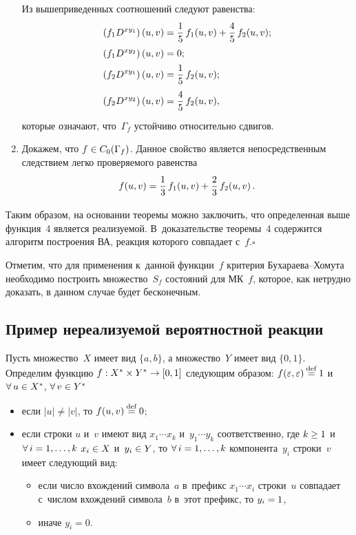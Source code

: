 \begin{multicols}{2}
\begin{enumerate}[1.]
Из вышеприведенных соотношений следуют равенства:
\begin{align*}
\left(f_1D^{xy_1}\right)(u,v)&=\displaystyle\frac{\displaystyle 1\mathstrut}{\displaystyle 5\mathstrut}\,f_1(u,v)+\displaystyle\frac{\displaystyle 4\mathstrut}{\displaystyle 5\mathstrut}\,f_2(u,v);\\
\left(f_1D^{xy_2}\right)(u,v)&=0;\\
\left(f_2D^{xy_1}\right)(u,v)&=\displaystyle\frac{\displaystyle 1\mathstrut}{\displaystyle 5\mathstrut}\,f_2(u,v);\\
\left(f_2D^{xy_2}\right)(u,v)&=\displaystyle\frac{\displaystyle 4\mathstrut}{\displaystyle 5\mathstrut}\,f_2(u,v),
\end{align*}
которые означают, что~$\Gamma_f$ устойчиво относительно сдвигов.

\item Докажем, что $f\hm\in C_0(\Gamma_f)$. Данное свойство
является непосредственным следствием легко проверяемого равенства
$$
f(u,v)=\displaystyle\frac{\displaystyle 1\mathstrut}{\displaystyle 3\mathstrut}\,f_1(u,v)+\displaystyle\frac{\displaystyle 2\mathstrut}{\displaystyle 3\mathstrut}\,f_2(u,v)\,.
$$
\end{enumerate}
Таким образом, на основании теоремы можно заключить, что
определенная выше функция~4 являет\-ся реализуемой.
В~доказательстве теоремы~4 содержится алгоритм построения
ВА, реакция которого совпадает с~$f$.\hfill$\square$

\medskip


Отметим, что для применения к~данной функции~$f$
критерия Бу\-ха\-ра\-ева--Хо\-му\-та необходимо построить
множество~$S_f$ состояний для МК~$f$, которое, как нетрудно доказать,
в данном случае будет бесконечным.


\subsection{Пример нереализуемой вероятностной реакции}

Пусть множество~$X$ имеет вид $\{a,b\}$,
а множество~$Y$ имеет вид $\{0,1\}$.
Определим функцию $f:X^*\times Y^*\hm\to [0,1]$
следующим образом: $f(\varepsilon,\varepsilon)\mathbin{{\mathop{=}\limits^{\mathrm{def}}}} 1$
и~$\forall\,u\hm\in X^*$, $\forall \,v\hm\in Y^*$
\begin{itemize}
\item если $|u|\neq |v|$, то $f(u,v)\mathbin{{\mathop{=}\limits^{\mathrm{def}}}} 0$;
\item если строки $u$ и~$v$ имеют вид
$x_1\cdots x_k$ и~$y_1\cdots y_k$ соответственно, где
$k\hm\geq 1$ и~$\forall\,i\hm=1,\ldots, k$ $x_i\hm\in X$ и~$y_i\hm\in Y$,
то $\forall\,i\hm=1,\ldots, k$
компонента~$y_i$ строки~$v$ имеет следующий вид:
\begin{itemize}
\item
если чис\-ло вхождений символа~$a$ в~префикс
$x_1 \cdots x_i$ строки~$u$ совпадает
с~чис\-лом вхож\-де\-ний символа~$b$ в~этот префикс, то $y_i\hm=1$,
\item иначе $y_i=0$.
\end{itemize}
\end{itemize}


\end{multicols}
